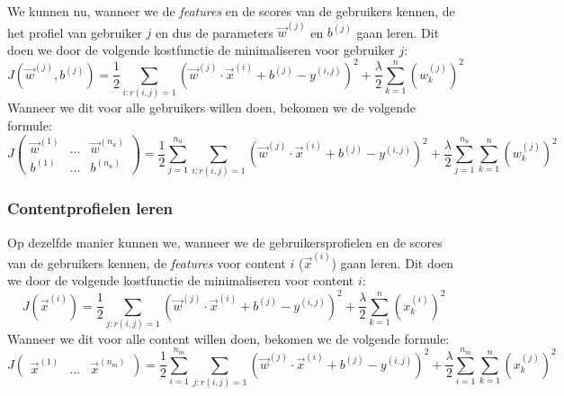 We kunnen nu, wanneer we de \textit{features} en de scores van de gebruikers kennen, de het profiel van gebruiker $j$ en dus de parameters $\vec{w}^{(j)}$ en $b^{(j)}$ gaan leren. Dit doen we door de volgende kostfunctie de minimaliseren voor gebruiker $j$:
\begin{equation}
	J(\vec{w}^{(j)}, b^{(j)}) = \frac{1}{2} \sum_{i:r(i, j) = 1} (\vec{w}^{(j)} \cdot \vec{x}^{(i)} + b^{(j)} - y^{(i, j)})^{2} + \frac{\lambda}{2} \sum_{k=1}^{n}(w_{k}^{(j)})^{2}
\end{equation}
\noindent
Wanneer we dit voor alle gebruikers willen doen, bekomen we de volgende formule:
\begin{equation}
	J \begin{pmatrix} \vec{w}^{(1)} & \ldots & \vec{w}^{(n_{u})}\\ b^{(1)} & \ldots & b^{(n_{u})} \end{pmatrix} 
	= \frac{1}{2} \sum_{j=1}^{n_{u}} \sum_{i:r(i, j) = 1} (\vec{w}^{(j)} \cdot \vec{x}^{(i)} + b^{(j)} - y^{(i, j)})^{2} 
	+ \frac{\lambda}{2} \sum_{j=1}^{n_{u}} \sum_{k=1}^{n}(w_{k}^{(j)})^{2}
	\label{eq:user-cost}
\end{equation}

\subsubsection{Contentprofielen leren}

Op dezelfde manier kunnen we, wanneer we de gebruikersprofielen en de scores van de gebruikers kennen, de \textit{features} voor content $i$ ($\vec{x}^{(i)}$) gaan leren. Dit doen we door de volgende kostfunctie de minimaliseren voor content $i$:
\begin{equation}
	J(\vec{x}^{(i)}) = \frac{1}{2} \sum_{j:r(i, j) = 1} (\vec{w}^{(j)} \cdot \vec{x}^{(i)} + b^{(j)} - y^{(i, j)})^{2} + \frac{\lambda}{2} \sum_{k=1}^{n}(x_{k}^{(i)})^{2}
\end{equation}
\noindent
Wanneer we dit voor alle content willen doen, bekomen we de volgende formule:
\begin{equation}
	J \begin{pmatrix} \vec{x}^{(1)} & \ldots & \vec{x}^{(n_{m})}\end{pmatrix} 
	= \frac{1}{2} \sum_{i=1}^{n_{m}} \sum_{j:r(i, j) = 1} (\vec{w}^{(j)} \cdot \vec{x}^{(i)} + b^{(j)} - y^{(i, j)})^{2} 
	+ \frac{\lambda}{2} \sum_{i=1}^{n_{m}} \sum_{k=1}^{n}(x_{k}^{(j)})^{2}
	\label{eq:content-cost}
\end{equation}

